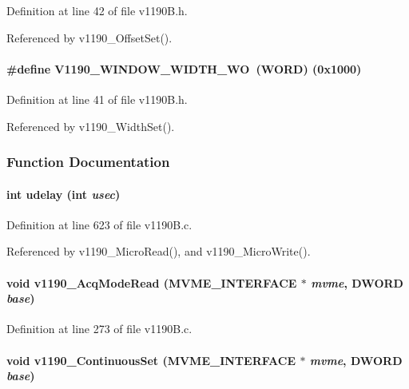 Definition at line 42 of file v1190B.h.

Referenced by v1190\_\-OffsetSet().
\paragraph[{V1190\_\-WINDOW\_\-WIDTH\_\-WO}]{\setlength{\rightskip}{0pt plus 5cm}\#define V1190\_\-WINDOW\_\-WIDTH\_\-WO~({\bf WORD}) (0x1000)}\hfill\label{v1190B_8h_a211bb6d05da79ad07d645166df1f57de}


Definition at line 41 of file v1190B.h.

Referenced by v1190\_\-WidthSet().

\subsubsection{Function Documentation}
\paragraph[{udelay}]{\setlength{\rightskip}{0pt plus 5cm}int udelay (int {\em usec})}\hfill\label{v1190B_8h_aeaa5c434da81fbdf4a665b67f66592bc}


Definition at line 623 of file v1190B.c.

Referenced by v1190\_\-MicroRead(), and v1190\_\-MicroWrite().
\paragraph[{v1190\_\-AcqModeRead}]{\setlength{\rightskip}{0pt plus 5cm}void v1190\_\-AcqModeRead ({\bf MVME\_\-INTERFACE} $\ast$ {\em mvme}, \/  {\bf DWORD} {\em base})}\hfill\label{v1190B_8h_adcf811a607936b82759f90d9b9f27bff}


Definition at line 273 of file v1190B.c.
\paragraph[{v1190\_\-ContinuousSet}]{\setlength{\rightskip}{0pt plus 5cm}void v1190\_\-ContinuousSet ({\bf MVME\_\-INTERFACE} $\ast$ {\em mvme}, \/  {\bf DWORD} {\em base})}\hfill\label{v1190B_8h_ac49fded0e6607ba8c67460b8e825e33b}


